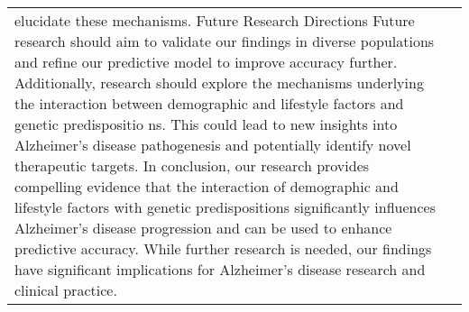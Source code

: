 \documentclass[conference]{IEEEtran}
\begin{document}
\begin{table}[htbp]
\begin{tabular}{|l|c|}
elucidate these mechanisms. Future Research Directions Future research should aim to validate our findings in diverse populations and refine our predictive model to improve accuracy further. Additionally, research should explore the mechanisms underlying the interaction between demographic and lifestyle factors and genetic predispositio ns. This could lead to new insights into Alzheimer's disease pathogenesis and potentially identify novel therapeutic targets. In conclusion, our research provides compelling evidence that the interaction of demographic and lifestyle factors with genetic predispositions significantly influences Alzheimer's disease progression and can be used to enhance predictive accuracy. While further research is needed, our findings have significant implications for Alzheimer's disease research and clinical practice.


\end{tabular}
\end{table}
\end{document}

